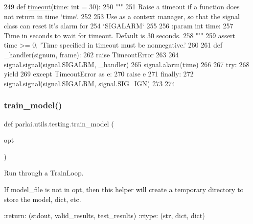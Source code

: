 \begin{DoxyCode}
249 \textcolor{keyword}{def }\hyperlink{namespaceparlai_1_1utils_1_1testing_aa8539ab1d17813b0c17f08700b2c2c2e}{timeout}(time: int = 30):
250     \textcolor{stringliteral}{"""}
251 \textcolor{stringliteral}{    Raise a timeout if a function does not return in time `time`.}
252 \textcolor{stringliteral}{}
253 \textcolor{stringliteral}{    Use as a context manager, so that the signal class can reset it's alarm for}
254 \textcolor{stringliteral}{    `SIGALARM`}
255 \textcolor{stringliteral}{}
256 \textcolor{stringliteral}{    :param int time:}
257 \textcolor{stringliteral}{        Time in seconds to wait for timeout. Default is 30 seconds.}
258 \textcolor{stringliteral}{    """}
259     \textcolor{keyword}{assert} time >= 0, \textcolor{stringliteral}{'Time specified in timeout must be nonnegative.'}
260 
261     \textcolor{keyword}{def }\_handler(signum, frame):
262         \textcolor{keywordflow}{raise} TimeoutError
263 
264     signal.signal(signal.SIGALRM, \_handler)
265     signal.alarm(time)
266 
267     \textcolor{keywordflow}{try}:
268         \textcolor{keywordflow}{yield}
269     \textcolor{keywordflow}{except} TimeoutError \textcolor{keyword}{as} e:
270         \textcolor{keywordflow}{raise} e
271     \textcolor{keywordflow}{finally}:
272         signal.signal(signal.SIGALRM, signal.SIG\_IGN)
273 
274 
\end{DoxyCode}
\mbox{\label{namespaceparlai_1_1utils_1_1testing_a005734981469efed8a992bf5edc3ca8a}} 
\subsubsection{\texorpdfstring{train\+\_\+model()}{train\_model()}}
{\footnotesize\ttfamily def parlai.\+utils.\+testing.\+train\+\_\+model (\begin{DoxyParamCaption}\item[{}]{opt }\end{DoxyParamCaption})}

\begin{DoxyVerb}Run through a TrainLoop.

If model_file is not in opt, then this helper will create a temporary
directory to store the model, dict, etc.

:return: (stdout, valid_results, test_results)
:rtype: (str, dict, dict)
\end{DoxyVerb}
 

